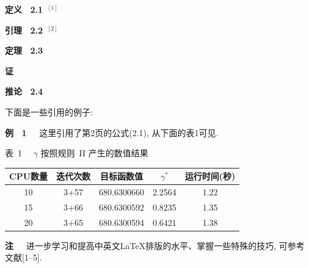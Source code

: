 \documentclass[a4paper,11pt,onecolumn,twoside]{ctexart}
\begin{document}
{\bf 定义~ 2.1}~$^{[1]}$~~~~    %



{\bf 引理~ 2.2}~$^{[2]}$~~    %




{\bf 定理~ 2.3~~}  %




{\bf 证~~}     %



{\bf  推论~ 2.4~~}  %



下面是一些引用的例子:


{\bf 例~ 1~~} 这里引用了第2页的公式(2.1), 从下面的表1可见.


\begin{center}
 {\small 表~1~~   $\gamma$ 按照规则~II 产生的数值结果}
 \vskip 2mm
\begin{tabular}{ccccc}
  \hline
 CPU数量 &  迭代次数 & 目标函数值 &  $\gamma^*$ & 运行时间(秒) \\
 \hline
   10 &  3+57 &     680.6300660&       2.2564 & 1.22\\
   15 &   3+66 &    680.6300592&      0.8235 &  1.35\\
    20 &    3+65 &     680.6300594&      0.6421 & 1.38\\
  \hline
  \end{tabular}
\end{center}


\vskip 4mm  \vskip 3mm
\setcounter{section}{3}\setcounter{equation}{0}


{\bf 注~~}
 进一步学习和提高中英文\LaTeX 排版的水平、掌握一些特殊的技巧,
 可参考文献[1--5].
\end{document}
